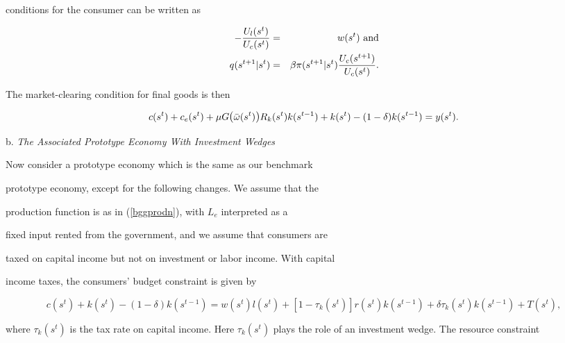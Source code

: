 \documentclass[fleqn,leqno,11pt]{article}
\begin{document}
conditions for the consumer can be written as 

\begin{eqnarray}

-\frac{U_{l}(s^{t})}{U_{c}(s^{t})} &=&w(s^{t})\text{ and}

\label{Euler for money} \\

q(s^{t+1}|s^{t}) &=&\beta \pi (s^{t+1}|s^{t})\frac{U_{c}(s^{t+1})}{%

U_{c}(s^{t})}.  \label{interest rate}

\end{eqnarray}



The market-clearing condition for final goods is then 

\[

c(s^{t})+c_{e}(s^{t})+\mu G\text{{\large (}}\bar{\omega}(s^{t})\text{{\large %

)}}R_{k}(s^{t})k(s^{t-1})+k(s^{t})-(1-\delta )k(s^{t-1})=y(s^{t}). 

\]



\bigskip



\noindent b. \emph{The Associated Prototype Economy With Investment Wedges}



Now consider a prototype economy which is the same as our benchmark

prototype economy, except for the following changes. We assume that the

production function is as in (\ref{bggprodn}), with $L_{e}$ interpreted as a

fixed input rented from the government, and we assume that consumers are

taxed on capital income but not on investment or labor income. With capital

income taxes, the consumers' budget constraint is given by 

\[

c(s^{t})+k(s^{t})-(1-\delta )k(s^{t-1})=w(s^{t})l(s^{t})+[1-\tau

_{k}(s^{t})]r(s^{t})k(s^{t-1})+\delta \tau _{k}(s^{t})k(s^{t-1})+T(s^{t}), 

\]%

where $\tau _{k}(s^{t})$ is the tax rate on capital income. Here $\tau

_{k}(s^{t})$ plays the role of an investment wedge. The resource constraint
\end{document}
